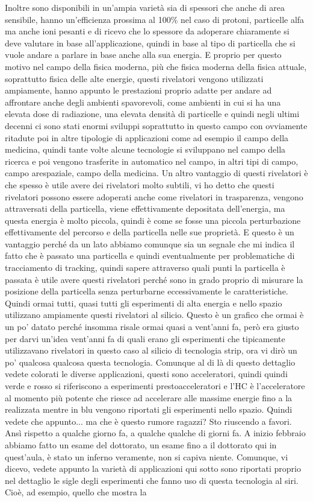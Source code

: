 {Inoltre sono disponibili in un'ampia varietà sia di spessori che anche di area sensibile, hanno un'efficienza prossima al 100\% nel caso di protoni, particelle alfa ma anche ioni pesanti e di ricevo che lo spessore da adoperare chiaramente si deve valutare in base all'applicazione, quindi in base al tipo di particella che si vuole andare a parlare in base anche alla sua energia. E proprio per questo motivo nel campo della fisica moderna, più che fisica moderna della fisica attuale, soprattutto fisica delle alte energie, questi rivelatori vengono utilizzati ampiamente, hanno appunto le prestazioni proprio adatte per andare ad affrontare anche degli ambienti spavorevoli, come ambienti in cui si ha una elevata dose di radiazione, una elevata densità di particelle e quindi negli ultimi decenni ci sono stati enormi sviluppi soprattutto in questo campo con ovviamente ritadute poi in altre tipologie di applicazioni come ad esempio il campo della medicina, quindi tante volte alcune tecnologie si sviluppano nel campo della ricerca e poi vengono trasferite in automatico nel campo, in altri tipi di campo, campo arespaziale, campo della medicina. Un altro vantaggio di questi rivelatori è che spesso è utile avere dei rivelatori molto subtili, vi ho detto che questi rivelatori possono essere adoperati anche come rivelatori in trasparenza, vengono attraversati della particella, viene effettivamente depositata dell'energia, ma questa energia è molto piccola, quindi è come se fosse una piccola perturbazione effettivamente del percorso e della particella nelle sue proprietà. E questo è un vantaggio perché da un lato abbiamo comunque sia un segnale che mi indica il fatto che è passato una particella e quindi eventualmente per problematiche di tracciamento di tracking, quindi sapere attraverso quali punti la particella è passata è utile avere questi rivelatori perché sono in grado proprio di misurare la posizione della particella senza perturbarne eccessivamente le caratteristiche. Quindi ormai tutti, quasi tutti gli esperimenti di alta energia e nello spazio utilizzano ampiamente questi rivelatori al silicio. Questo è un grafico che ormai è un po' datato perché insomma risale ormai quasi a vent'anni fa, però era giusto per darvi un'idea vent'anni fa di quali erano gli esperimenti che tipicamente utilizzavano rivelatori in questo caso al silicio di tecnologia strip, ora vi dirò un po' qualcosa qualcosa questa tecnologia. Comunque al di là di questo dettaglio vedete colorati le diverse applicazioni, questi sono acceleratori, quindi quindi verde e rosso si riferiscono a esperimenti prestoacceleratori e l'HC è l'acceleratore al momento più potente che riesce ad accelerare alle massime energie fino a la realizzata mentre in blu vengono riportati gli esperimenti nello spazio. Quindi vedete che appunto... ma che è questo rumore ragazzi? Sto riuscendo a favori. Ansì rispetto a qualche giorno fa, a qualche qualche di giorni fa. A inizio febbraio abbiamo fatto un esame del dottorato, un esame fino a il dottorato qui in quest'aula, è stato un inferno veramente, non si capiva niente. Comunque, vi dicevo, vedete appunto la varietà di applicazioni qui sotto sono riportati proprio nel dettaglio le sigle degli esperimenti che fanno uso di questa tecnologia al siri. Cioè, ad esempio, quello che mostra la }
